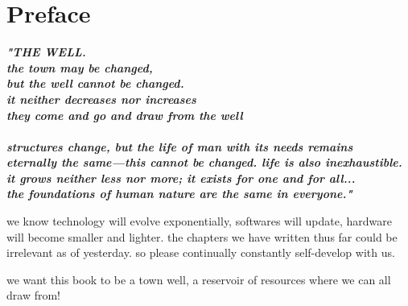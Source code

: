 
\SkipTocEntry\chapter*{Preface}
\addtocounter{section}{1}
\begin{fullwidth}

{\itshape\bfseries "THE WELL.
\\
the town may be changed,
\\
but the well cannot be changed.
\\
it neither decreases nor increases
\\
they come and go and draw from the well
\\
\\
structures change, but the life of man with its needs remains
\\
eternally the same—this cannot be changed. life is also inexhaustible. 
\\
it grows neither less nor more; it exists for one and for all...
\\
the foundations of human nature are the same in everyone."

}

we know technology will evolve exponentially, softwares will update, hardware will become smaller and lighter. the chapters we have written thus far could be irrelevant as of yesterday. so please continually constantly self-develop with us. 

we want this book to be a town well, a reservoir of resources where we can all draw from!

\clearpage
\end{fullwidth}
